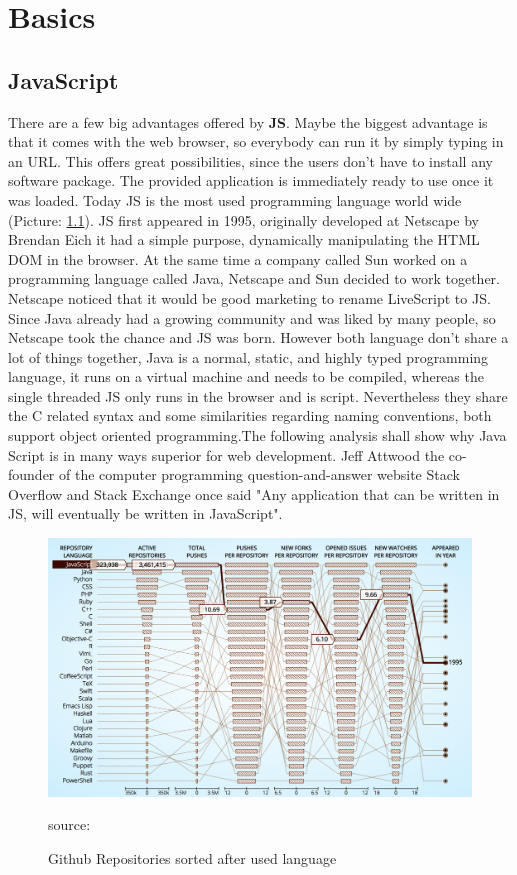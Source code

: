 \chapter{Basics}

\section{JavaScript}
There are a few big advantages offered by \textbf{\gls{JS}}. Maybe the biggest advantage is that it comes with the web browser, so everybody can run it by simply typing in an \gls{URL}. This offers great possibilities, since the users don't have to install any software package. The provided application is immediately ready to use once it was loaded. Today \gls{JS} is the most used programming language world wide (Picture: \ref{fig:JS}). \gls{JS} first appeared in 1995, originally developed at Netscape by Brendan Eich it had a simple purpose, dynamically manipulating the HTML DOM in the browser. At the same time a company called Sun worked on a programming language called Java, Netscape and Sun decided to work together. Netscape noticed that it would be good marketing to rename LiveScript to \gls{JS}. Since Java already had a growing community and was liked by many people, so Netscape took the chance and \gls{JS} was born. However both language don't share a lot of things together, Java is a normal, static, and highly typed programming language, it runs on a virtual machine and needs to be compiled, whereas the single threaded \gls{JS} only runs in the browser and is script. Nevertheless they share the C related syntax and some similarities regarding naming conventions, both support object oriented programming.The following analysis shall show why Java Script is in many ways superior for web development. Jeff Attwood the co-founder of the  computer programming question-and-answer website Stack Overflow and Stack Exchange once said "Any application that can be written in \gls{JS}, will eventually be written in JavaScript". \cite{HistoryJS1} \cite{HistoryJS2} \cite{HistoryJS3}

\begin{figure}
	\centering
	\includegraphics[scale=0.5]{bilder/grundlagen/jsUsage.png}
	\caption{Github Repositories sorted after used language} source:\cite{JS}
	\label{fig:JS}
\end{figure}

